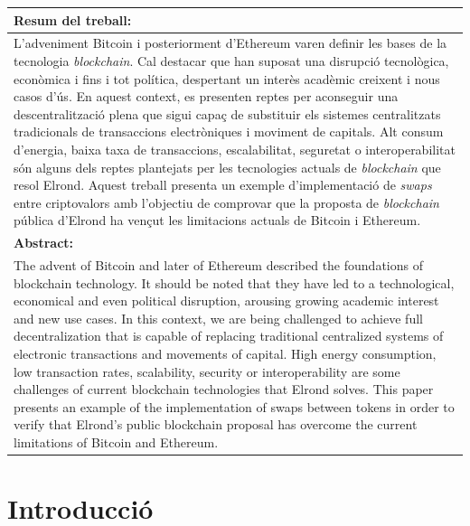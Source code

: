 \documentclass[11pt,a4paper]{article}
\begin{document}
\begin{tabularx}{\textwidth}{|X|}
\textbf{Resum del treball:}  \\ 
\hline 
\cellcolor{gray!25} L'adveniment Bitcoin i posteriorment d'Ethereum varen definir les bases de la tecnologia \textit{blockchain}. Cal destacar que han suposat una disrupció tecnològica, econòmica i fins i tot política, despertant un interès acadèmic creixent i nous casos d'ús. En aquest context, es presenten reptes per aconseguir una descentralització plena que sigui capaç de substituir els sistemes centralitzats tradicionals de transaccions electròniques i moviment de capitals. Alt consum d'energia, baixa taxa de transaccions, escalabilitat, seguretat o interoperabilitat són alguns dels reptes plantejats per les tecnologies actuals de \textit{blockchain} que resol Elrond. Aquest treball presenta un exemple d'implementació de \textit{swaps} entre criptovalors amb l'objectiu de comprovar que la proposta de \textit{blockchain} pública d'Elrond ha vençut les limitacions actuals de Bitcoin i Ethereum. \\
\hline 
\textbf{Abstract:}  \\ 
\hline 
\cellcolor{gray!25} The advent of Bitcoin and later of Ethereum described the foundations of blockchain technology. It should be noted that they have led to a technological, economical and even political disruption, arousing growing academic interest and new use cases. In this context, we are being challenged to achieve full decentralization that is capable of replacing traditional centralized systems of electronic transactions and movements of capital. High energy consumption, low transaction rates, scalability, security or interoperability are some challenges of current blockchain technologies that Elrond solves. This paper presents an example of the implementation of swaps between tokens in order to verify that Elrond's public blockchain proposal has overcome the current limitations of Bitcoin and Ethereum. \\
\hline 
\end{tabularx} 
\newpage 


\tableofcontents
\newpage


\listoffigures
\newpage


\section{Introducció}
\end{document}

